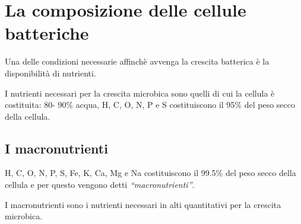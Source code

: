 \documentclass[11pt]{book}
\begin{document}
\section{La composizione delle cellule batteriche}
Una delle condizioni necessarie affinchè avvenga la crescita batterica è la disponibilità di nutrienti.

I nutrienti necessari per la crescita microbica sono quelli di cui la cellula è costituita: 80- 90$\%$ acqua, H, C, O, N, P e S costituiscono il 95$\%$ del peso secco della cellula.

\subsection{I macronutrienti}
H, C, O, N, P, S, Fe, K, Ca, Mg e Na costituiscono il 99.5$\%$  del peso secco della cellula e per questo vengono detti \emph{``macronutrienti''}.

I macronutrienti sono i nutrienti necessari in alti quantitativi per la crescita microbica.
\end{document}
